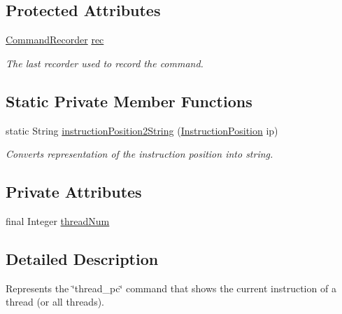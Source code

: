 \subsection*{Protected Attributes}
\begin{DoxyCompactItemize}
\item 
\hyperlink{classgov_1_1nasa_1_1jpf_1_1inspector_1_1client_1_1_command_recorder}{Command\+Recorder} \hyperlink{classgov_1_1nasa_1_1jpf_1_1inspector_1_1client_1_1_client_command_af4246f2427035c72a6af45a2c61361f7}{rec}
\begin{DoxyCompactList}\small\item\em The last recorder used to record the command. \end{DoxyCompactList}\end{DoxyCompactItemize}
\subsection*{Static Private Member Functions}
\begin{DoxyCompactItemize}
\item 
static String \hyperlink{classgov_1_1nasa_1_1jpf_1_1inspector_1_1client_1_1commands_1_1_cmd_threads_p_c_a38362b12b7130a339449f05be2e6e4e2}{instruction\+Position2\+String} (\hyperlink{interfacegov_1_1nasa_1_1jpf_1_1inspector_1_1interfaces_1_1_instruction_position}{Instruction\+Position} ip)
\begin{DoxyCompactList}\small\item\em Converts representation of the instruction position into string. \end{DoxyCompactList}\end{DoxyCompactItemize}
\subsection*{Private Attributes}
\begin{DoxyCompactItemize}
\item 
final Integer \hyperlink{classgov_1_1nasa_1_1jpf_1_1inspector_1_1client_1_1commands_1_1_cmd_threads_p_c_aea47647fbd31b75c65e90b909429cfa3}{thread\+Num}
\end{DoxyCompactItemize}


\subsection{Detailed Description}
Represents the \char`\"{}thread\+\_\+pc\char`\"{} command that shows the current instruction of a thread (or all threads). 


